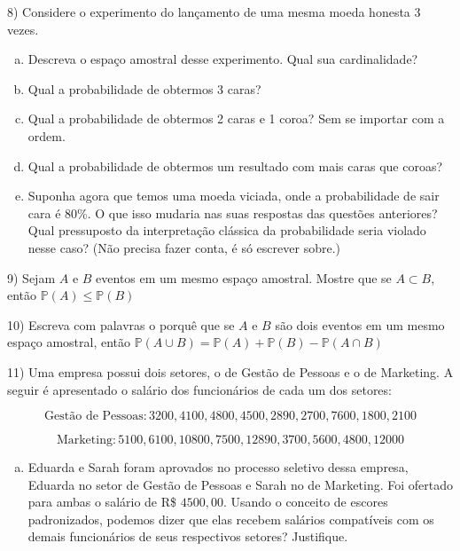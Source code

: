\documentclass[12pt]{article}
\begin{document}
\vspace{5px}

8) Considere o experimento do lançamento de uma mesma moeda honesta 3 vezes.  

\begin{enumerate}[a)]
    \item Descreva o espaço amostral desse experimento. Qual sua cardinalidade?
    \item Qual a probabilidade de obtermos 3 caras? 
    \item Qual a probabilidade de obtermos 2 caras e 1 coroa? Sem se importar com a ordem. 
    \item Qual a probabilidade de obtermos um resultado com mais caras que coroas? 
    \item Suponha agora que temos uma moeda viciada, onde a probabilidade de sair cara é 80\%. O que isso mudaria nas suas respostas das questões anteriores? 
    Qual pressuposto da interpretação clássica da probabilidade seria violado nesse caso? (Não precisa fazer conta, é só escrever sobre.)
\end{enumerate}

\vspace{5px}

9) Sejam $A$ e $B$ eventos em um mesmo espaço amostral. Mostre que se $A \subset B$, então $\mathds{P}(A) \leq \mathds{P}(B)$

\vspace{5px}

10) Escreva com palavras o porquê que se $A$ e $B$ são dois eventos em um mesmo espaço amostral, então $\mathds{P}(A \cup B) = \mathds{P}(A) + \mathds{P}(B) - \mathds{P}(A \cap B)$

11) Uma empresa possui dois setores, o de Gestão de Pessoas e o de Marketing. A seguir é apresentado o salário dos funcionários de cada um dos setores:

$$\text{Gestão de Pessoas}: 3200, 4100, 4800, 4500, 2890, 2700, 7600, 1800, 2100$$

$$\text{Marketing}: 5100, 6100, 10800, 7500, 12890, 3700, 5600, 4800, 12000$$

\begin{enumerate}[a)]
    \item Eduarda e Sarah foram aprovados no processo seletivo dessa empresa, Eduarda no setor de Gestão de Pessoas e Sarah no de Marketing.
     Foi ofertado para ambas o salário de R\$ $4500,00$. Usando o conceito de escores padronizados, podemos dizer que elas recebem salários compatíveis com os demais funcionários de seus respectivos setores? Justifique.
\end{enumerate}
\end{document}
